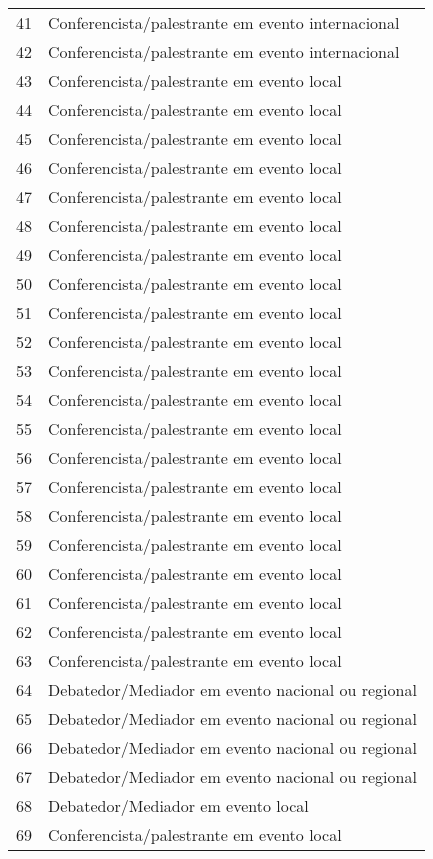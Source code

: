 \documentclass[a4paper,oneside,10pt]{article}
\begin{document}
{\begin{longtable}[H]{@{} r P{8cm} @{}}
41 & {Conferencista/palestrante em evento internacional}\\
42 & {Conferencista/palestrante em evento internacional}\\
43 & {Conferencista/palestrante em evento local}\\
44 & {Conferencista/palestrante em evento local}\\
45 & {Conferencista/palestrante em evento local}\\
46 & {Conferencista/palestrante em evento local}\\
47 & {Conferencista/palestrante em evento local}\\
48 & {Conferencista/palestrante em evento local}\\
49 & {Conferencista/palestrante em evento local}\\
50 & {Conferencista/palestrante em evento local}\\
51 & {Conferencista/palestrante em evento local}\\
52 & {Conferencista/palestrante em evento local}\\
53 & {Conferencista/palestrante em evento local}\\
54 & {Conferencista/palestrante em evento local}\\
55 & {Conferencista/palestrante em evento local}\\
56 & {Conferencista/palestrante em evento local}\\
57 & {Conferencista/palestrante em evento local}\\
58 & {Conferencista/palestrante em evento local}\\
59 & {Conferencista/palestrante em evento local}\\
60 & {Conferencista/palestrante em evento local}\\
61 & {Conferencista/palestrante em evento local}\\
62 & {Conferencista/palestrante em evento local}\\  
63 & {Conferencista/palestrante em evento local}\\
64 & {Debatedor/Mediador em evento nacional ou regional}\\
65 & {Debatedor/Mediador em evento nacional ou regional}\\
66 & {Debatedor/Mediador em evento nacional ou regional}\\
67 & {Debatedor/Mediador em evento nacional ou regional}\\
68 & {Debatedor/Mediador em evento local}\\
69 & {Conferencista/palestrante em evento local}\\

\end{longtable}}
\end{document}
